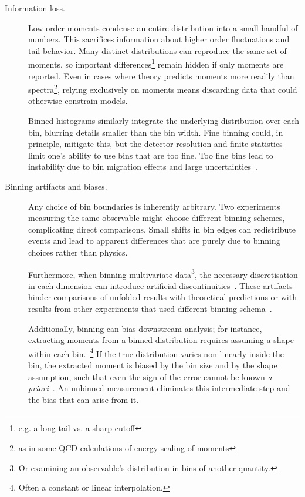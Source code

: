     \begin{description}
        \item [Information loss.]
            Low order moments condense an entire distribution into a small handful of numbers.
            This sacrifices information about higher order fluctuations and tail behavior.
            Many distinct distributions can reproduce the same set of moments, so important differences\footnote{e.g. a long tail vs. a sharp cutoff} remain hidden if only moments are reported.
            Even in cases where theory predicts moments more readily than spectra\footnote{as in some QCD calculations of energy scaling of moments}, relying exclusively on moments means discarding data that could otherwise constrain models.
            
            Binned histograms similarly integrate the underlying distribution over each bin, blurring details smaller than the bin width.
            Fine binning could, in principle, mitigate this, but the detector resolution and finite statistics limit one's ability to use bins that are too fine.
            Too fine bins lead to instability due to bin migration effects and large uncertainties~\cite{Bessner:2017trm, LHCb:2023qav, ATLAS:2024hmk, CMS:2025dnx, Kutz:2024eaq, ATLAS:2016vlf}.
        \item[Binning artifacts and biases.]
            Any choice of bin boundaries is inherently arbitrary.
            Two experiments measuring the same observable might choose different binning schemes, complicating direct comparisons.
            Small shifts in bin edges can redistribute events and lead to apparent differences that are purely due to binning choices rather than physics.
            
            Furthermore, when binning multivariate data\footnote{Or examining an observable's distribution in bins of another quantity.}, the necessary discretisation in each dimension can introduce artificial discontinuities~\cite{GomezAmbrosio:2022mpm, Fiorendi:2014klw, KLOE-2:2025ggc, Ressegotti:2024szk, LHCb:2025eyf, Grosso:2024nho,}.
            These artifacts hinder comparisons of unfolded results with theoretical predictions or with results from other experiments that used different binning schema~\cite{Brehmer:2018hga}.
            
            Additionally, binning can bias downstream analysis;
            for instance, extracting moments from a binned distribution requires assuming a shape within each bin.~\footnote{Often a constant or linear interpolation.}
            If the true distribution varies non-linearly inside the bin, the extracted moment is biased by the bin size and by the shape assumption, such that even the sign of the error cannot be known \textit{a priori}~\cite{desai2024moment}.
            An unbinned measurement eliminates this intermediate step and the bias that can arise from it.
            

\end{description}
